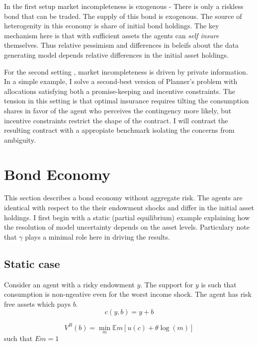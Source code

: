 \documentclass[12pt]{article}
\begin{document}
In the first setup market incompleteness is exogenous - There is only a riskless bond that can be traded. The supply of this bond is exogenous. The source of heterogenity in this economy is share of initial bond holdings. The key mechanism here is that with sufficient assets the agents can \emph{self insure} themselves. Thus relative pessimism and differences in beleifs about the data generating model depends relative differences in the initial asset holdings.

For the second setting , market incompleteness is driven by private information. In a simple example, I solve a second-best version of Planner's problem with allocations satisfying both a promise-keeping and incentive constraints. The tension in this setting is that optimal insurance requires tilting the consumption shares in favor of the agent who perceives the contingency more likely, but incentive constraints restrict the shape of the contract. I will contrast the resulting contract with a appropiate benchmark isolating the concerns from ambiguity. 


\section{Bond Economy}
This section describes a bond economy without aggregate risk. The agents are identical with respect to the their endowment shocks and differ in the initial asset holdings. I first begin with a static (partial equilibrium) example explaining how the resolution of model uncertainty depends on the asset levels. Particulary note that $\gamma$ plays a minimal role here in driving the results.

\subsection{Static case}
Consider an agent with a risky endowment $y$. The support for $y$ is such that consumption is non-ngeative even for the worst income shock. The agent has risk free assets which pays $b$. 
\[c(y,b)=y+b\]

\[V^R (b)=\min_{m}\mathbb{E}m[u(c)+\theta\log(m)]\]
such that 
$Em=1$
 
\end{document}
